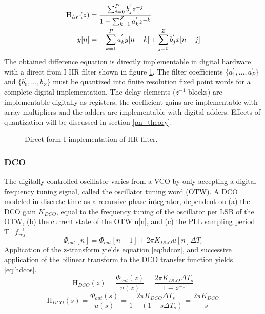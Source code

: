 	\begin{align}
		\textnormal{H}_{LF}(z) &= \frac{\sum_{j=0}^P b_j^{'}z^{-j}}{1+\sum_{k=1}^Z a_k^{'}z^{-k}}\label{eq:canonical_z_tf} \\
		y[n]&= -\sum_{k=1}^P a_k^{'}y[n-k] + \sum_{j=0}^Z b_j^{'}x[n-j] \label{eq:cananical_diff_eq}
	\end{align}
	The obtained difference equation is directly implementable in digital hardware with a direct from I IIR filter \cite{proakis_1993} shown in figure \ref{fig:filt_implementation}. The filter coefficients $\{a_1^{'}, ..., a_P^{'}\}$ and $\{b_0^{'}, ..., b_Z^{'}\}$ must be quantized into finite resolution fixed point words for a complete digital implementation. The delay elements ($z^{-1}$ blocks) are implementable digitally as registers, the coefficient gains are implementable with array multipliers and the adders are implementable with digital adders. Effects of quantization will be discussed in section \ref{pn_theory}.
	\begin{figure}[htb!]
		\center
		\caption{Direct form I implementation of IIR filter.}
		\label{fig:filt_implementation}
	\end{figure}


\subsubsection{DCO}
	The digitally controlled oscillator varies from a VCO by only accepting a digital frequency tuning signal, called the oscillator tuning word (OTW). A DCO modeled in discrete time as a recursive phase integrator, dependent on (a) the DCO gain $K_{DCO}$, equal to the frequency tuning of the oscillator per LSB of the OTW, (b) the current state of the OTW u[n], and (c) the PLL sampling period T=$f_{ref}^{-1}$.
	\begin{equation}
		\Phi_{out}[n] = \Phi_{out}[n-1] + 2\pi K_{DCO}u[n]\Delta T_s
	\end{equation}
	Application of the z-transform yields equation \ref{eq:hdcoz}, and successive application of the bilinear transform to the DCO transfer function yields  \ref{eq:hdcos}.
	\begin{equation}\label{eq:hdcoz}
		\mathrm{H}_{DCO}(z) = \frac{\Phi_{out}(z)}{u(z)} = \frac{2\pi K_{DCO}\Delta T_s}{1-z^{-1}}
	\end{equation}
	\begin{equation}\label{eq:hdcos}
		\mathrm{H}_{DCO}(s) = \frac{\Phi_{out}(s)}{u(s)} = \frac{2\pi K_{DCO}\Delta T_s}{1-(1-s\Delta T_s)} = \frac{2\pi K_{DCO}}{s} 
	\end{equation}

